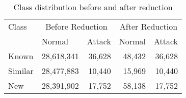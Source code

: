 \begin{table}[!htb]
    \centering
    \caption{Class distribution before and after reduction}
    \label{table-class-distribution}
    \begin{tabular}{llrrr}
         \toprule
Class&   \multicolumn{2}{c}{Before Reduction}& \multicolumn{2}{c}{After Reduction}\\
&  Normal& Attack& Normal&Attack\\
\midrule
Known & 28,618,341& 36,628& 48,432&36,628\\
Similar & 28,477,883& 10,440& 15,969&10,440\\
New & 28,391,902& 17,752& 58,138&17,752\\
\bottomrule
\end{tabular}
\end{table}